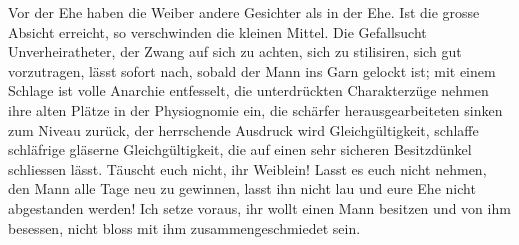 Vor der Ehe haben die Weiber andere Gesichter als in der Ehe. Ist die grosse Absicht erreicht, so verschwinden die kleinen Mittel. Die Gefallsucht Unverheiratheter, der Zwang auf sich zu achten, sich zu stilisiren, sich gut vorzutragen, lässt sofort nach, sobald der Mann ins Garn gelockt ist; mit einem Schlage ist volle Anarchie entfesselt, die unterdrückten Charakterzüge nehmen ihre alten Plätze in der Physiognomie ein, die schärfer herausgearbeiteten sinken zum Niveau zurück, der herrschende Ausdruck wird Gleichgültigkeit, schlaffe schläfrige gläserne Gleichgültigkeit, die auf einen sehr sicheren Besitzdünkel schliessen lässt. Täuscht euch nicht, ihr Weiblein! Lasst es euch nicht nehmen, den Mann alle Tage neu zu gewinnen, lasst ihn nicht lau und eure Ehe nicht abgestanden werden! Ich setze voraus, ihr wollt einen Mann besitzen und von ihm besessen, nicht bloss mit ihm zusammengeschmiedet sein.
\par

